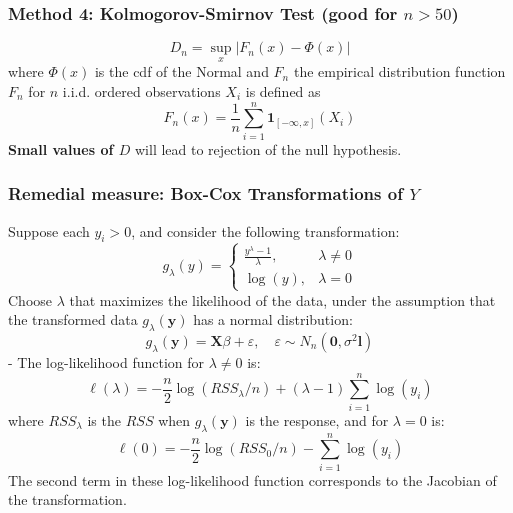 \documentclass[11pt,a4paper]{article}
\begin{document}
\subsubsection{Method 4: Kolmogorov-Smirnov Test (good for $n > 50$)}
$$D_n=\sup_x |F_n(x)-\Phi(x)|$$
where $\Phi(x)$ is the cdf of the Normal and $F_n$ the empirical distribution function $F_n$ for $n$ i.i.d. ordered observations $X_i$ is deﬁned as
$$F_n(x)=\frac{1}{n}\sum_{i=1}^n \mathbf{1}_{[-\infty,x]}(X_i)$$
\textbf{Small values of $D$} will lead to rejection of the null hypothesis.

\subsubsection{Remedial measure: Box-Cox Transformations of $Y$}

Suppose each $y_i>0$, and consider the following transformation:
$$g_\lambda(y)=\left\{\begin{matrix}
    \frac{y^\lambda-1}{\lambda},&\lambda\neq0\\
    \log(y),& \lambda=0
\end{matrix}\right.$$
Choose $\lambda$ that maximizes the likelihood of the data, under the assumption that the transformed data $g_{\lambda}(\mathbf{y})$ has a normal distribution:
$$
g_{\lambda}(\mathbf{y})=\mathbf{X} \beta+\varepsilon, \quad \varepsilon \sim N_{n}\left(\mathbf{0}, \sigma^{2} \mathbf{l}\right)
$$
- The log-likelihood function for $\lambda \neq 0$ is:
$$
\ell(\lambda)=-\frac{n}{2} \log \left(R S S_{\lambda} / n\right)+(\lambda-1) \sum_{i=1}^{n} \log \left(y_{i}\right)
$$
where $R S S_{\lambda}$ is the $R S S$ when $g_{\lambda}(\mathbf{y})$ is the response, and for $\lambda=0$ is:
$$
\ell(0)=-\frac{n}{2} \log \left(R S S_{0} / n\right)-\sum_{i=1}^{n} \log \left(y_{i}\right)
$$
The second term in these log-likelihood function corresponds to the Jacobian of the transformation.\\
\end{document}
